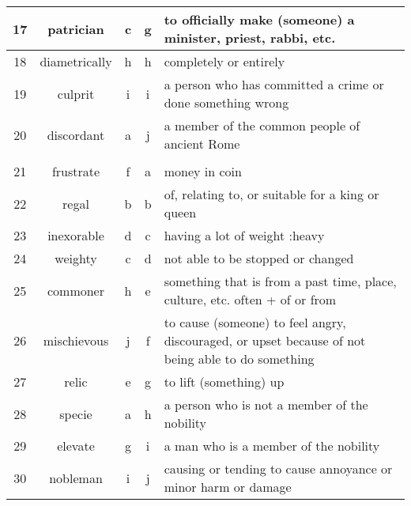 \documentclass[a4paper]{article}
\begin{document}
\begin{center}
\begin{tabular}{|c|c|c|c|m{}|}
\hline
 17  & patrician & c & g &  to officially make (someone) a minister, priest, rabbi, etc. \\
\hline
 18  & diametrically & h & h &  completely or entirely \\
\hline
 19  & culprit & i & i &  a person who has committed a crime or done something wrong \\
\hline
 20  & discordant & a & j &  a member of the common people of ancient Rome\\
\hline
 & & & & \\
\hline
 21  & frustrate & f & a &  money in coin\\
\hline
 22  & regal & b & b &  of, relating to, or suitable for a king or queen \\
\hline
 23  & inexorable & d & c &  having a lot of weight :heavy \\
\hline
 24  & weighty & c & d &  not able to be stopped or changed \\
\hline
 25  & commoner & h & e &  something that is from a past time, place, culture, etc. often + of or from \\
\hline
 26  & mischievous & j & f &  to cause (someone) to feel angry, discouraged, or upset because of not being able to do something \\
\hline
 27  & relic & e & g &  to lift (something) up \\
\hline
 28  & specie & a & h &  a person who is not a member of the nobility \\
\hline
 29  & elevate & g & i &  a man who is a member of the nobility\\
\hline
 30  & nobleman & i & j &  causing or tending to cause annoyance or minor harm or damage \\
\hline
\end{tabular}
\end{center}
\end{document}
